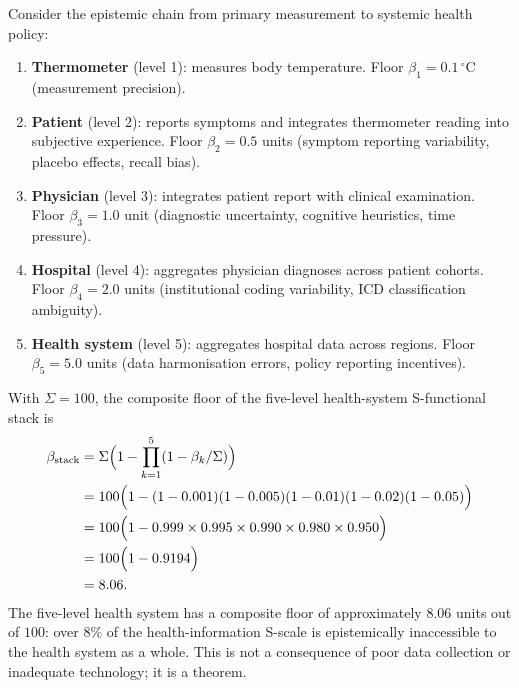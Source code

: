 \begin{example}
\label{ex:ch02-health-system-stack}
Consider the epistemic chain from primary measurement to systemic health policy:
\begin{enumerate}[(1)]
  \item \textbf{Thermometer} (level 1): measures body temperature.  Floor
    $\beta_1 = 0.1\,^\circ\text{C}$ (measurement precision).
  \item \textbf{Patient} (level 2): reports symptoms and integrates thermometer
    reading into subjective experience.  Floor $\beta_2 = 0.5$ units (symptom
    reporting variability, placebo effects, recall bias).
  \item \textbf{Physician} (level 3): integrates patient report with clinical
    examination.  Floor $\beta_3 = 1.0$ unit (diagnostic uncertainty, cognitive
    heuristics, time pressure).
  \item \textbf{Hospital} (level 4): aggregates physician diagnoses across
    patient cohorts.  Floor $\beta_4 = 2.0$ units (institutional coding
    variability, ICD classification ambiguity).
  \item \textbf{Health system} (level 5): aggregates hospital data across
    regions.  Floor $\beta_5 = 5.0$ units (data harmonisation errors, policy
    reporting incentives).
\end{enumerate}
With $\Sigma = 100$, the composite floor of the five-level health-system
S-functional stack is
\begin{align*}
  \beta_{\mathrm{stack}}
  &= \Sigma\Bigl(1 - \prod_{k=1}^5 (1 - \beta_k/\Sigma)\Bigr) \\
  &= 100\Bigl(1 - (1 - 0.001)(1 - 0.005)(1 - 0.01)(1 - 0.02)(1 - 0.05)\Bigr)\\
  &= 100\Bigl(1 - 0.999 \times 0.995 \times 0.990 \times 0.980 \times 0.950\Bigr)\\
  &= 100\Bigl(1 - 0.9194\Bigr)\\
  &= 8.06.
\end{align*}
The five-level health system has a composite floor of approximately $8.06$ units
out of $100$: over $8\%$ of the health-information S-scale is epistemically
inaccessible to the health system as a whole.  This is not a consequence of poor
data collection or inadequate technology; it is a theorem.


\end{example}
